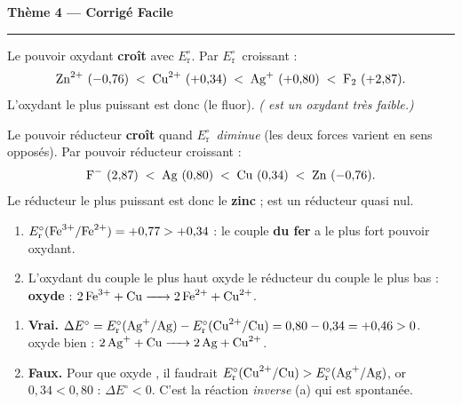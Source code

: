 \documentclass[11pt,a4paper]{article}
\newcommand{\Ered}{\ensuremath{E_{\mathrm{r}}^{\circ}}}
\begin{document}
\begin{center}
{\LARGE\bfseries\color{primarydark}Thème 4 — Corrigé Facile}\\[-2pt]
{\color{corrcol}\rule{\textwidth}{1pt}}
\end{center}

\begin{corr}
Le pouvoir oxydant \textbf{croît} avec \Ered. Par \Ered\ croissant :
\[
\ce{Zn^{2+}}\ (-0{,}76) \;<\; \ce{Cu^{2+}}\ (+0{,}34) \;<\; \ce{Ag+}\ (+0{,}80) \;<\; \ce{F2}\ (+2{,}87).
\]
L'oxydant le plus puissant est donc \textbf{} (le fluor). \emph{( est un oxydant très faible.)}
\end{corr}

\begin{corr}
Le pouvoir réducteur \textbf{croît} quand \Ered\ \emph{diminue} (les deux forces varient en sens
opposés). Par pouvoir réducteur croissant :
\[
\ce{F^-}\ (2{,}87) \;<\; \ce{Ag}\ (0{,}80) \;<\; \ce{Cu}\ (0{,}34) \;<\; \ce{Zn}\ (-0{,}76).
\]
Le réducteur le plus puissant est donc le \textbf{zinc } ;  est un réducteur quasi nul.
\end{corr}

\begin{corr}
\begin{enumerate}[label=(\alph*),leftmargin=2em,topsep=1pt,itemsep=1.5pt]
  \item $\Ered(\ce{Fe^{3+}}/\ce{Fe^{2+}})=+0{,}77 > +0{,}34$ : le couple \textbf{du fer} a le plus fort
        pouvoir oxydant.
  \item L'oxydant du couple le plus haut oxyde le réducteur du couple le plus bas :
        \textbf{ oxyde } : $\ce{2 Fe^{3+} + Cu -> 2 Fe^{2+} + Cu^{2+}}$.
\end{enumerate}
\end{corr}

\begin{corr}
\begin{enumerate}[label=(\alph*),leftmargin=2em,topsep=1pt,itemsep=1.5pt]
  \item \textbf{Vrai.} $\Delta E^{\circ}=\Ered(\ce{Ag+}/\ce{Ag})-\Ered(\ce{Cu^{2+}}/\ce{Cu})=0{,}80-0{,}34=+0{,}46>0$.
         oxyde bien  : $\ce{2 Ag+ + Cu -> 2 Ag + Cu^{2+}}$.
  \item \textbf{Faux.} Pour que  oxyde , il faudrait $\Ered(\ce{Cu^{2+}}/\ce{Cu})>\Ered(\ce{Ag+}/\ce{Ag})$,
        or $0{,}34<0{,}80$ : $\Delta E^{\circ}<0$. C'est la réaction \emph{inverse} (a) qui est spontanée.
\end{enumerate}
\end{corr}
\end{document}
